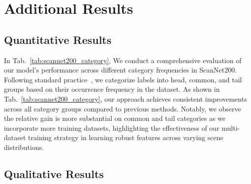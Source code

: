 \section{Additional Results}

\subsection{Quantitative Results}
In Tab.~\ref{tab:scannet200_category}, 
We conduct a comprehensive evaluation of our model's performance across different category frequencies in ScanNet200. 
Following standard practice~\cite{scannet200}, we categorize labels into head, common, and tail groups based on their occurrence frequency in the dataset.  
As shown in Tab.~\ref{tab:scannet200_category}, our approach achieves consistent improvements across all category groups compared to previous methods.
Notably, we observe the relative gain is more substantial on common and tail categories as we incorporate more training datasets, highlighting the effectiveness of our multi-dataset training strategy in learning robust features across varying scene distributions.


\subsection{Qualitative Results}

